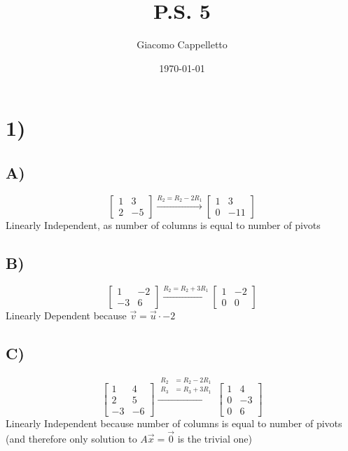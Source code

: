 \documentclass{article}
\title{P.S. 5}
\author{Giacomo Cappelletto}
\date{\today}
\begin{document}
\maketitle

\section*{1)}

\subsection*{A)}

\[
	\begin{bmatrix}
		1 & 3  \\
		2 & -5
	\end{bmatrix}
	\xrightarrow{R_2 = R_2 - 2R_1}
	\begin{bmatrix}
		1 & 3   \\
		0 & -11
	\end{bmatrix}
\]
Linearly Independent, as number of columns is equal to number of pivots
\subsection*{B)}

\[
	\begin{bmatrix}
		1  & -2 \\
		-3 & 6
	\end{bmatrix}
	\xrightarrow{R_2 = R_2 + 3R_1}
	\begin{bmatrix}
		1 & -2 \\
		0 & 0
	\end{bmatrix}
\]
Linearly Dependent because \(\vec{v} = \vec{u} \cdot -2\)

\subsection*{C)}
\[
	\begin{bmatrix}
		1  & 4  \\
		2  & 5  \\
		-3 & -6
	\end{bmatrix}
	\xrightarrow{
		\begin{aligned}
			R_2 & = R_2 - 2R_1 \\
			R_3 & = R_3 + 3R_1
		\end{aligned}
	}
	\begin{bmatrix}
		1 & 4  \\
		0 & -3 \\
		0 & 6
	\end{bmatrix}
\]
Linearly Independent because number of columns is equal to number of pivots (and therefore only solution to \(A\vec{x}=\vec{0}\) is the trivial one)
\end{document}
